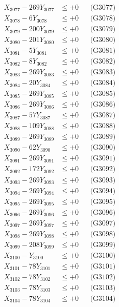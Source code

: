 \documentclass[a4paper,10pt]{article}
\begin{document}
{\begin{align}
X_{3077} - 269Y_{3077} &\leq +0 && \text{(G3077)} \\
X_{3078} - 6Y_{3078} &\leq +0 && \text{(G3078)} \\
X_{3079} - 200Y_{3079} &\leq +0 && \text{(G3079)} \\
X_{3080} - 201Y_{3080} &\leq +0 && \text{(G3080)} \\
\allowbreak
X_{3081} - 5Y_{3081} &\leq +0 && \text{(G3081)} \\
X_{3082} - 8Y_{3082} &\leq +0 && \text{(G3082)} \\
X_{3083} - 269Y_{3083} &\leq +0 && \text{(G3083)} \\
X_{3084} - 20Y_{3084} &\leq +0 && \text{(G3084)} \\
X_{3085} - 269Y_{3085} &\leq +0 && \text{(G3085)} \\
X_{3086} - 269Y_{3086} &\leq +0 && \text{(G3086)} \\
X_{3087} - 57Y_{3087} &\leq +0 && \text{(G3087)} \\
X_{3088} - 109Y_{3088} &\leq +0 && \text{(G3088)} \\
X_{3089} - 269Y_{3089} &\leq +0 && \text{(G3089)} \\
X_{3090} - 62Y_{3090} &\leq +0 && \text{(G3090)} \\
\allowbreak
X_{3091} - 269Y_{3091} &\leq +0 && \text{(G3091)} \\
X_{3092} - 172Y_{3092} &\leq +0 && \text{(G3092)} \\
X_{3093} - 269Y_{3093} &\leq +0 && \text{(G3093)} \\
X_{3094} - 269Y_{3094} &\leq +0 && \text{(G3094)} \\
X_{3095} - 269Y_{3095} &\leq +0 && \text{(G3095)} \\
X_{3096} - 269Y_{3096} &\leq +0 && \text{(G3096)} \\
X_{3097} - 269Y_{3097} &\leq +0 && \text{(G3097)} \\
X_{3098} - 269Y_{3098} &\leq +0 && \text{(G3098)} \\
X_{3099} - 208Y_{3099} &\leq +0 && \text{(G3099)} \\
X_{3100} - Y_{3100} &\leq +0 && \text{(G3100)} \\
\allowbreak
X_{3101} - 78Y_{3101} &\leq +0 && \text{(G3101)} \\
X_{3102} - 78Y_{3102} &\leq +0 && \text{(G3102)} \\
X_{3103} - 78Y_{3103} &\leq +0 && \text{(G3103)} \\
X_{3104} - 78Y_{3104} &\leq +0 && \text{(G3104)} \\

\end{align}}
\end{document}
